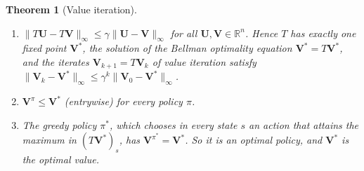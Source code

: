 \documentclass[11pt]{article}
\newcommand{\norm}[1]{\lVert #1 \rVert}
\theoremstyle{definition}
\theoremstyle{plain}
\newtheorem{theorem}[definition]{Theorem}
\theoremstyle{remark}
\begin{document}
\begin{theorem}[Value iteration]\label{thm:value-iteration}
    \begin{enumerate}
        \item $\norm{T\mathbf{U} - T\mathbf{V}}_\infty \leq \gamma\norm{\mathbf{U} - \mathbf{V}}_\infty$ for all $\mathbf{U}, \mathbf{V} \in \mathbb{R}^n$. Hence $T$ has exactly one fixed point $\mathbf{V}^*$, the solution of the Bellman optimality equation $\mathbf{V}^* = T\mathbf{V}^*$, and the iterates $\mathbf{V}_{k+1} = T\mathbf{V}_k$ of value iteration satisfy $\norm{\mathbf{V}_k - \mathbf{V}^*}_\infty \leq \gamma^k\norm{\mathbf{V}_0 - \mathbf{V}^*}_\infty$.
        \item $\mathbf{V}^\pi \leq \mathbf{V}^*$ (entrywise) for every policy $\pi$.
        \item The greedy policy $\pi^*$, which chooses in every state $s$ an action that attains the maximum in $(T\mathbf{V}^*)_s$, has $\mathbf{V}^{\pi^*} = \mathbf{V}^*$. So it is an optimal policy, and $\mathbf{V}^*$ is the optimal value.
    \end{enumerate}
\end{theorem}
\end{document}
